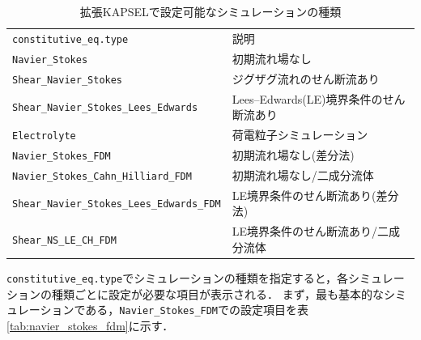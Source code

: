 \documentclass[pdflatex,a4paper,10pt,ja=standard]{bxjsarticle}
\begin{document}
\begin{table}[htbp]
    \centering
    \caption{拡張KAPSELで設定可能なシミュレーションの種類}
    \begin{tabular}{ll}
        \toprule
        \verb|constitutive_eq.type| & 説明 \\
        \cmidrule(r){1-1}
        \cmidrule(r){2-2}
        \rowcolor{lightgray!60}
        \verb|Navier_Stokes| & 初期流れ場なし \\
        \rowcolor{lightgray!60}
        \verb|Shear_Navier_Stokes| & ジグザグ流れのせん断流あり \\
        \rowcolor{lightgray!60}
        \verb|Shear_Navier_Stokes_Lees_Edwards| & Lees--Edwards(LE)境界条件のせん断流あり \\
        \rowcolor{lightgray!60}
        \verb|Electrolyte| & 荷電粒子シミュレーション \\
        \verb|Navier_Stokes_FDM| & 初期流れ場なし(差分法) \\
        \verb|Navier_Stokes_Cahn_Hilliard_FDM| & 初期流れ場なし/二成分流体\\
        \verb|Shear_Navier_Stokes_Lees_Edwards_FDM| & LE境界条件のせん断流あり(差分法) \\
        \verb|Shear_NS_LE_CH_FDM| & LE境界条件のせん断流あり/二成分流体 \\
        \bottomrule
    \end{tabular}
    \label{tab:constitutive_eq_type}
\end{table}

\verb|constitutive_eq.type|でシミュレーションの種類を指定すると，各シミュレーションの種類ごとに設定が必要な項目が表示される．
まず，最も基本的なシミュレーションである，\verb|Navier_Stokes_FDM|での設定項目を表\ref{tab:navier_stokes_fdm}に示す．
\end{document}
